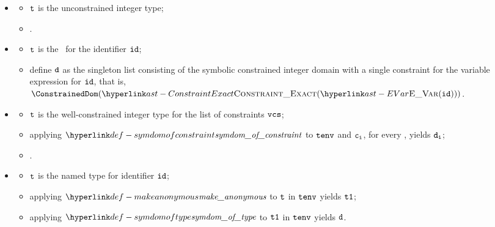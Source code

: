 \ProseParagraph
\OneApplies
\begin{itemize}
  \item {}
  \begin{itemize}
    \item $\vt$ is the unconstrained integer type;
    \item {}.
  \end{itemize}

  \item {}
  \begin{itemize}
    \item $\vt$ is the \parameterizedintegertypeterm\ for the identifier $\id$;
    \item define $\vd$ as the singleton list consisting of the
          symbolic constrained integer domain with a single constraint for the variable expression for $\id$,
          that is, \\ $\ConstrainedDom(\ConstraintExact(\EVar(\id)))$.
  \end{itemize}

  \item {}
  \begin{itemize}
    \item $\vt$ is the well-constrained integer type for the list of constraints $\vcs$;
    \item applying $\symdomofconstraint$ to $\tenv$ and $\vc_\vi$, for every \Proselistrange{$\vi$}{$\vcs$},
          yields $\vd_\vi$;
    \item {}.
  \end{itemize}

  \item {}
  \begin{itemize}
    \item $\vt$ is the named type for identifier $\id$;
    \item applying $\makeanonymous$ to $\vt$ in $\tenv$ yields $\vtone$;
    \item applying $\symdomoftype$ to $\vtone$ in $\tenv$ yields $\vd$.
  \end{itemize}
\end{itemize}

\FormallyParagraph
\begin{mathpar}
\end{mathpar}

